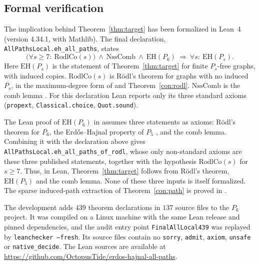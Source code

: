 \documentclass[11pt,a4paper]{article}
\theoremstyle{definition}
\theoremstyle{remark}
\numberwithin{equation}{section}
\newcommand{\EH}{\mathrm{EH}}
\begin{document}
\subsection{Formal verification}\label{subsec:formal}
The implication behind Theorem~\ref{thm:target} has been formalized in Lean~4 (version 4.34.1, with Mathlib). The final declaration, \texttt{AllPathsLocal.eh\_all\_paths}, states
\[
 \bigl(\forall s\ge 7:\ \mathrm{RodlCo}(s)\bigr)\ \wedge\ \mathrm{NssComb}\ \wedge\ \mathrm{EH}(P_6)
 \ \Longrightarrow\ \forall s:\ \mathrm{EH}(P_s).
\]
Here \(\mathrm{EH}(P_s)\) is the statement of Theorem~\ref{thm:target} for finite \(P_s\)-free graphs, with induced copies. \(\mathrm{RodlCo}(s)\) is R\"odl's theorem \cite{rodl} for graphs with no induced \(\overline{P_s}\), in the maximum-degree form of \cite[Theorem~1.3]{nss7} and Theorem~\ref{con:rodl}. \(\mathrm{NssComb}\) is the comb lemma \cite[Lemma~4.3]{nss7}. For this declaration Lean reports only its three standard axioms (\texttt{propext}, \texttt{Classical.choice}, \texttt{Quot.sound}).

The Lean proof of \(\EH(P_6)\) in \cite{p6} assumes three statements as axioms: R\"odl's theorem for \(\overline{P_6}\), the Erd\H{o}s--Hajnal property of \(P_5\) \cite[Theorem~1.2]{nss7}, and the comb lemma. Combining it with the declaration above gives \texttt{AllPathsLocal.eh\_all\_paths\_of\_rodl}, whose only non-standard axioms are these three published statements, together with the hypothesis \(\mathrm{RodlCo}(s)\) for \(s\ge7\). Thus, in Lean, Theorem~\ref{thm:target} follows from R\"odl's theorem, \(\EH(P_5)\) and the comb lemma. None of these three inputs is itself formalized. The sparse induced-path extraction of Theorem~\ref{con:path} is proved in \cite{p6}.

The development adds \(439\) theorem declarations in \(137\) source files to the \(P_6\) project. It was compiled on a Linux machine with the same Lean release and pinned dependencies, and the audit entry point \texttt{FinalAllLocal439} was replayed by \texttt{leanchecker --fresh}. Its source files contain no \texttt{sorry}, \texttt{admit}, \texttt{axiom}, \texttt{unsafe} or \texttt{native\_decide}. The Lean sources are available at \url{https://github.com/OctopusTide/erdos-hajnal-all-paths}.
\end{document}
